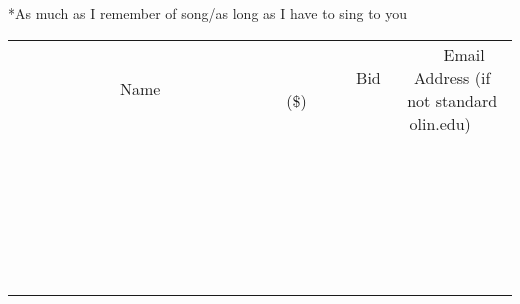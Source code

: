 \documentclass[11pt]{article}
\begin{document}
*As much as I remember of song/as long as I have to sing to you
\\[6ex]
\begin{tabular}{c c c}
~~~~~~~~~~~~~Name~~~~~~~~~~~~~ & ~~~~~~~~~Bid (\$)~~~~~~~~~  & ~~~Email Address (if not standard olin.edu)~~~\\
 & & \\
\hline
 & & \\
\hline
 & & \\
\hline
 & & \\
\hline
 & & \\
\hline
 & & \\
\hline
 & & \\
\hline
 & & \\
\hline
 & & \\
\hline
 & & \\
\hline
 & & \\
\hline
 & & \\
\hline
 & & \\
\hline
 & & \\
\hline
 & & \\
\hline
 & & \\
\hline
 & & \\
\hline
 & & \\
\hline
 & & \\
\hline
 & & \\
\hline
 & & \\
\hline
 & & \\
\hline
 & & \\
\hline
 & & \\
\hline
 & & \\
\hline
 & & \\
\hline
\end{tabular}
\newpage
\end{document}

